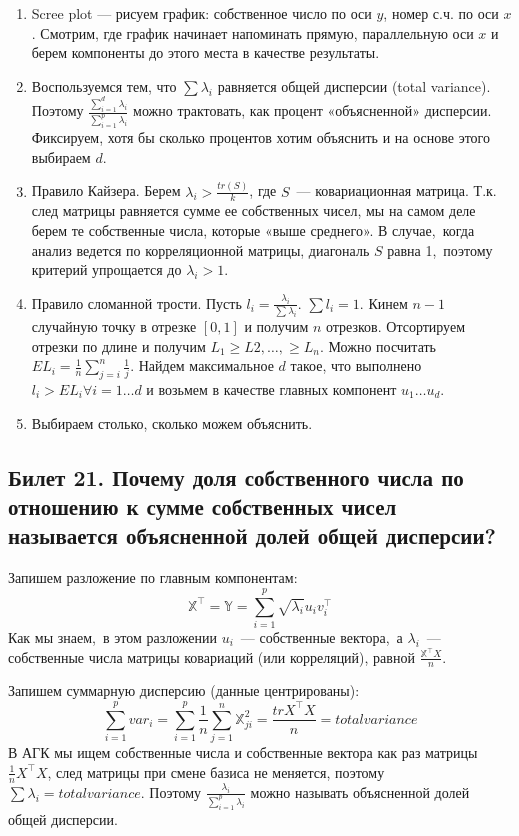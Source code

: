 \begin{enumerate}
\item Scree plot — рисуем график: собственное число по оси $y$, номер с.ч. по оси $x$. Смотрим, где график начинает напоминать прямую, параллельную оси $x$ и берем компоненты до этого места в качестве результаты.
\item Воспользуемся тем, что $\sum \lambda_i$ равняется общей дисперсии (total variance). Поэтому 
$\frac{\sum_{i=1}^{d} \lambda_i}{\sum_{i=1}^{p}\lambda_i}$ можно трактовать, как процент «объясненной» дисперсии. Фиксируем, хотя бы сколько процентов хотим объяснить и на основе этого выбираем $d$.
\item Правило Кайзера. Берем $\lambda_i > \frac{tr(S)}{k}$, где $S$ — ковариационная матрица. Т.к. след матрицы равняется сумме ее собственных чисел, мы на самом деле берем те собственные числа, которые «выше среднего». 
В случае, когда анализ ведется по корреляционной матрицы, диагональ $S$ равна 1, поэтому критерий упрощается до $\lambda_i > 1$. 
\item Правило сломанной трости. Пусть $l_i = \frac{\lambda_i}{\sum\lambda_i}$. $\sum l_i = 1$. Кинем $n-1$ случайную точку в отрезке $[0,1]$ и получим $n$ отрезков. Отсортируем отрезки по длине и получим $L_1 \geq L2,…,\geq L_n$. Можно посчитать $EL_i = \frac{1}{n}\sum\limits_{j=i}^{n} \frac{1}{j}$. 
Найдем максимальное $d$  такое, что выполнено $l_i > EL_i \forall i = 1…d$ и возьмем в качестве главных компонент $u_1…u_d$. 
\item Выбираем столько, сколько можем объяснить.  
\end{enumerate} 

\subsection{Билет 21. Почему доля собственного числа по отношению к сумме собственных чисел называется
объясненной долей общей дисперсии?}
Запишем разложение по главным компонентам:
$$ \mathbb{X}^{\intercal}=\mathbb{Y} = \sum \limits_{i=1}^{p} \sqrt{\lambda_i}u_iv_i^{\intercal}$$
Как мы знаем, в этом разложении $u_i$ — собственные вектора, а $\lambda_i$ — собственные числа матрицы ковариаций (или корреляций), равной $\frac{\mathbb{X}^{\intercal}X}{n}$.

Запишем суммарную дисперсию (данные центрированы):
$$ \sum_{i=1}^{p} var_i= \sum_{i=1}^{p} \frac{1}{n}\sum_{j=1}^{n}\mathbb{X}_{ji}^2 = \frac{tr{X^{\intercal}X}}{n} = total variance$$
В АГК мы ищем собственные числа и собственные вектора как раз матрицы $\frac{1}{n}X^{\intercal}X$, след матрицы при смене базиса не меняется, поэтому $\sum \lambda_i = total variance$. 
Поэтому $\frac{\lambda_i}{\sum\limits_{i=1}^{p}\lambda_i}$ можно называть объясненной долей общей дисперсии. 
